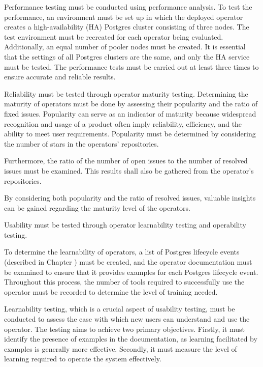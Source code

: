 Performance testing must be conducted using performance analysis. To test the performance, an environment must be set up in which the deployed operator creates a high-availability (HA) Postgres cluster consisting of three nodes.
The test environment must be recreated for each operator being evaluated. Additionally, an equal number of pooler nodes must be created. It is essential that the settings of all Postgres clusters are the same, and only the HA service must be tested.
The performance tests must be carried out at least three times to ensure accurate and reliable results.

Reliability must be tested through operator maturity testing.
Determining the maturity of operators must be done by assessing their popularity and the ratio of fixed issues. Popularity can serve as an indicator of maturity because widespread recognition and usage of a product often imply reliability, efficiency, and the ability to meet user requirements.
Popularity must be determined by considering the number of stars in the operators' repositories.

Furthermore, the ratio of the number of open issues to the number of resolved issues must be examined. This results shall also be gathered from the operator’s repositories.

By considering both popularity and the ratio of resolved issues, valuable insights can be gained regarding the maturity level of the operators.

Usability must be tested through operator learnability testing and operability testing.

To determine the learnability of operators, a list of Postgres lifecycle events (described in Chapter ) must be created, and the operator documentation must be examined to ensure that it provides examples for each Postgres lifecycle event. Throughout this process, the number of tools required to successfully use the operator must be recorded to determine the level of training needed.

Learnability testing, which is a crucial aspect of usability testing, must be conducted to assess the ease with which new users can understand and use the operator. The testing aims to achieve two primary objectives. Firstly, it must identify the presence of examples in the documentation, as learning facilitated by examples is generally more effective. Secondly, it must measure the level of learning required to operate the system effectively.

